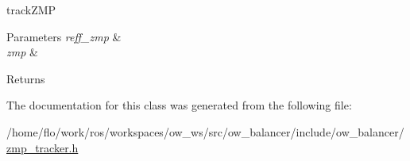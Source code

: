 track\+Z\+MP 


\begin{DoxyParams}{Parameters}
{\em reff\+\_\+zmp} & \\
\hline
{\em zmp} & \\
\hline
\end{DoxyParams}
\begin{DoxyReturn}{Returns}

\end{DoxyReturn}


The documentation for this class was generated from the following file\+:\begin{DoxyCompactItemize}
\item 
/home/flo/work/ros/workspaces/ow\+\_\+ws/src/ow\+\_\+balancer/include/ow\+\_\+balancer/\hyperlink{zmp__tracker_8h}{zmp\+\_\+tracker.\+h}\end{DoxyCompactItemize}
